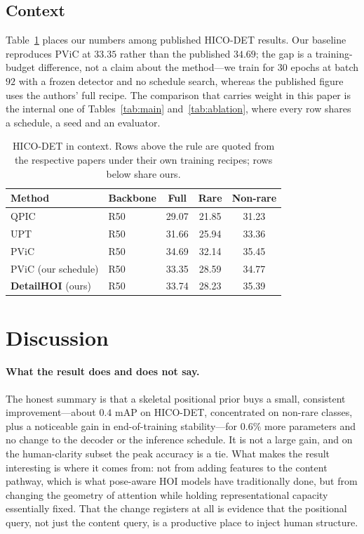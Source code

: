 \documentclass[12pt,a4paper]{article}
\begin{document}
\subsection{Context}

Table~\ref{tab:sota} places our numbers among published HICO-DET results.
Our baseline reproduces PViC at $33.35$ rather than the published $34.69$; the
gap is a training-budget difference, not a claim about the method---we train
for $30$ epochs at batch $92$ with a frozen detector and no schedule search,
whereas the published figure uses the authors' full recipe. The comparison that
carries weight in this paper is the internal one of Tables~\ref{tab:main}
and~\ref{tab:ablation}, where every row shares a schedule, a seed and an
evaluator.

\begin{table}[t]
\centering\small
\caption{HICO-DET in context. Rows above the rule are quoted from the
respective papers under their own training recipes; rows below share ours.}
\label{tab:sota}
\setlength{\tabcolsep}{4pt}
\begin{tabular}{llccc}
\toprule
Method & Backbone & Full & Rare & Non-rare \\
\midrule
QPIC~\cite{tamura2021qpic}       & R50 & 29.07 & 21.85 & 31.23 \\
UPT~\cite{zhang2022upt}          & R50 & 31.66 & 25.94 & 33.36 \\
PViC~\cite{zhang2023pvic}        & R50 & 34.69 & 32.14 & 35.45 \\
\midrule
PViC (our schedule)              & R50 & 33.35 & 28.59 & 34.77 \\
\textbf{DetailHOI} (ours)        & R50 & 33.74 & 28.23 & 35.39 \\
\bottomrule
\end{tabular}
\end{table}

\section{Discussion}
\label{sec:discussion}

\paragraph{What the result does and does not say.} The honest summary is that a
skeletal positional prior buys a small, consistent improvement---about $0.4$ mAP
on HICO-DET, concentrated on non-rare classes, plus a noticeable gain in
end-of-training stability---for $0.6\%$ more parameters and no change to the
decoder or the inference schedule. It is not a large gain, and on the
human-clarity subset the peak accuracy is a tie. What makes the result
interesting is where it comes from: not from adding features to the content
pathway, which is what pose-aware HOI models have traditionally done, but from
changing the geometry of attention while holding representational capacity
essentially fixed. That the change registers at all is evidence that the
positional query, not just the content query, is a productive place to inject
human structure.
\end{document}
